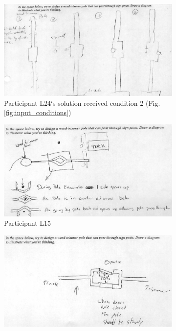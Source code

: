 \documentclass[12pt]{article}
\begin{document}
\begin{figure}[h!]
  \centering
    \begin{subfigure}[b]{0.8\linewidth}
    \includegraphics[width=\linewidth]{images/drawing_l24_con2.PNG}
    \caption{Participant L24`s solution received condition 2 (Fig. \ref{fig:input_conditions})}
  \end{subfigure}
  \begin{subfigure}[b]{0.3\linewidth}
    \includegraphics[width=\linewidth]{images/drawing_l15_con2.PNG}
     \caption{Participant L15}
  \end{subfigure}
  \begin{subfigure}[b]{0.3\linewidth}
    \includegraphics[width=\linewidth]{images/drawing_l16_con1.PNG}

\end{subfigure}
\end{figure}
\end{document}
